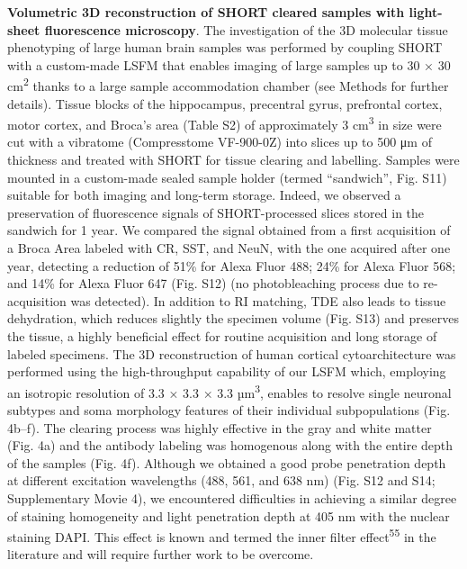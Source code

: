 \documentclass{article}
\begin{document}
\textbf{Volumetric 3D reconstruction of SHORT cleared samples with light-sheet fluorescence microscopy}. The investigation of the 3D molecular tissue phenotyping of large human brain samples was performed by coupling SHORT with a custom-made LSFM that enables imaging of large samples up to 30 × 30 cm\textsuperscript{2} thanks to a large sample accommodation chamber (see Methods for further details). Tissue blocks of the hippocampus, precentral gyrus, prefrontal cortex, motor cortex, and Broca’s area (Table S2) of approximately 3 cm\textsuperscript{3} in size were cut with a vibratome (Compresstome VF-900-0Z) into slices up to 500 μm of thickness and treated with SHORT for tissue clearing and labelling. Samples were mounted in a custom-made sealed sample holder (termed “sandwich”, Fig. S11) suitable for both imaging and long-term storage. Indeed, we observed a preservation of fluorescence signals of SHORT-processed slices stored in the sandwich for 1 year. We compared the signal obtained from a first acquisition of a Broca Area labeled with CR, SST, and NeuN, with the one acquired after one year, detecting a reduction of 51\% for Alexa Fluor 488; 24\% for Alexa Fluor 568; and 14\% for Alexa Fluor 647 (Fig. S12) (no photobleaching process due to re-acquisition was detected). In addition to RI matching, TDE also leads to tissue dehydration, which reduces slightly the specimen volume (Fig. S13) and preserves the tissue, a highly beneficial effect for routine acquisition and long storage of labeled specimens. The 3D reconstruction of human cortical cytoarchitecture was performed using the high-throughput capability of our LSFM which, employing an isotropic resolution of 3.3 × 3.3 × 3.3 µm\textsuperscript{3}, enables to resolve single neuronal subtypes and soma morphology features of their individual subpopulations (Fig. 4b–f). The clearing process was highly effective in the gray and white matter (Fig. 4a) and the antibody labeling was homogenous along with the entire depth of the samples (Fig. 4f). Although we obtained a good probe penetration depth at different excitation wavelengths (488, 561, and 638 nm) (Fig. S12 and S14; Supplementary Movie 4), we encountered difficulties in achieving a similar degree of staining homogeneity and light penetration depth at 405 nm with the nuclear staining DAPI. This effect is known and termed the inner filter effect\textsuperscript{55} in the literature and will require further work to be overcome.
\end{document}
